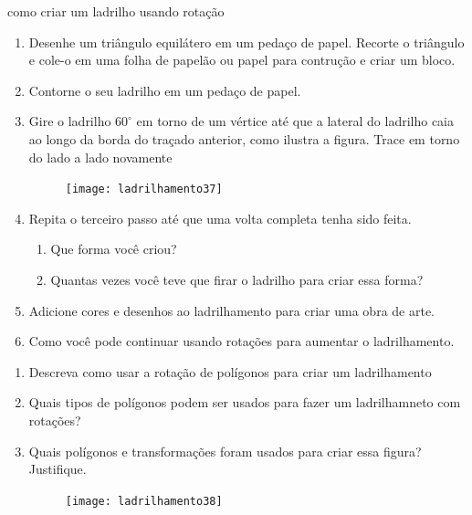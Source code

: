 \begin{task}{como criar um ladrilho usando rotação}

\begin{enumerate}
	\item Desenhe um triângulo equilátero em um pedaço de papel. Recorte o triângulo e cole-o em uma folha de papelão ou papel para contrução e criar um bloco.
	\item Contorne o seu ladrilho em um pedaço de papel.
	\item Gire o ladrilho $60^{\circ}$ em torno de um vértice até que a lateral do ladrilho caia ao longo da borda do traçado anterior, como ilustra a figura. Trace em torno do lado a lado novamente

	\begin{figure}[H]
	\centering
	\texttt{[image: ladrilhamento37]}

	\end{figure}

	\item Repita o terceiro passo até que uma volta completa tenha sido feita.
	\begin{enumerate}
		\item Que forma você criou?
		\item Quantas vezes você teve que firar o ladrilho para criar essa forma?
	\end{enumerate}

	\item Adicione cores e desenhos ao ladrilhamento para criar uma obra de arte.

	\item Como você pode continuar usando rotações para aumentar o ladrilhamento.

\end{enumerate}


\begin{enumerate}
	\item Descreva como usar a rotação de polígonos para criar um ladrilhamento
	\item Quais tipos de polígonos podem ser usados para fazer um ladrilhamneto com rotações?

	\item Quais polígonos e transformações foram usados para criar essa figura? Justifique.

	\begin{figure}[H]
	\centering
	\texttt{[image: ladrilhamento38]}

	\end{figure}




\end{enumerate}

\end{task}


